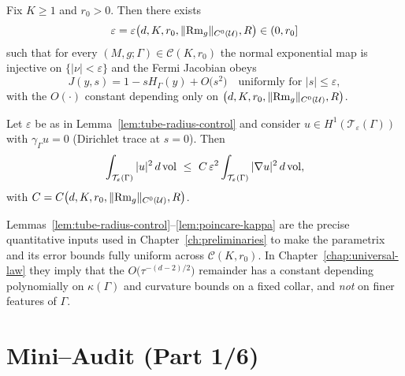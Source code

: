\begin{lemma}
\label{lem:tube-radius-control}
Fix $K\ge 1$ and $r_0>0$. Then there exists
\[
\varepsilon=\varepsilon\big(d,K,r_0,\|{\rm Rm}_g\|_{C^0(\mathcal{U})},R\big)\in(0,r_0]
\]
such that for every $(M,g;\Gamma)\in\mathcal{C}(K,r_0)$ the normal exponential map is injective on $\{|\nu|<\varepsilon\}$ and the Fermi Jacobian obeys
\[
J(y,s)=1-sH_\Gamma(y)+O\big( s^2\big)\quad\text{uniformly for } |s|\le \varepsilon,
\]
with the $O(\cdot)$ constant depending only on $\big(d,K,r_0,\|{\rm Rm}_g\|_{C^0(\mathcal{U})},R\big)$.
\end{lemma}

\begin{lemma}
\label{lem:poincare-kappa}
Let $\varepsilon$ be as in Lemma~\ref{lem:tube-radius-control} and consider $u\in H^1(\mathcal{T}_\varepsilon(\Gamma))$ with $\gamma_\Gamma u=0$ (Dirichlet trace at $s=0$). Then
\[
\int_{\mathcal{T}_\varepsilon(\Gamma)} |u|^2\,d\operatorname{vol}
\ \le\ C\,\varepsilon^2\int_{\mathcal{T}_\varepsilon(\Gamma)} |\nabla u|^2\,d\operatorname{vol},
\]
with $C=C\big(d,K,r_0,\|{\rm Rm}_g\|_{C^0(\mathcal{U})},R\big)$.
\end{lemma}

\begin{remark}
Lemmas~\ref{lem:tube-radius-control}–\ref{lem:poincare-kappa} are the precise quantitative inputs used in Chapter~\ref{ch:preliminaries} to make the parametrix and its error bounds fully uniform across $\mathcal{C}(K,r_0)$. In Chapter~\ref{chap:universal-law} they imply that the $O\!\big(\tau^{-(d-2)/2}\big)$ remainder has a constant depending polynomially on $\kappa(\Gamma)$ and curvature bounds on a fixed collar, and \emph{not} on finer features of $\Gamma$.
\end{remark}

\bigskip

\section{Mini–Audit (Part 1/6)}
\label{sec:mini-audit-part1}

